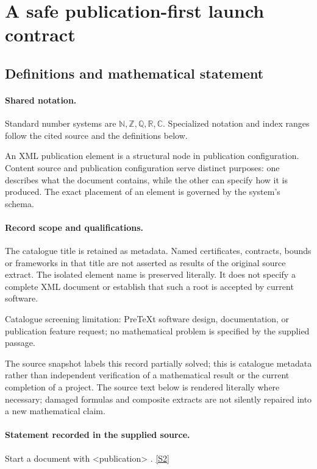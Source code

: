 \documentclass[11pt]{article}
\newcommand{\sref}[2]{\hyperlink{source:#1:#2}{[S#2]}}
\begin{document}
\section{A safe publication-first launch contract}\label{statement}

\subsection{Definitions and mathematical statement}

\paragraph{Shared notation.}Standard number systems are $\mathbb N,\mathbb Z,\mathbb Q,\mathbb R,\mathbb C$. Specialized notation and index ranges follow the cited source and the definitions below.


An XML publication element is a structural node in publication configuration. Content source and publication configuration serve distinct purposes: one describes what the document contains, while the other can specify how it is produced. The exact placement of an element is governed by the system's schema.
\paragraph{Record scope and qualifications.}
The catalogue title is retained as metadata. Named certificates, contracts, bounds or frameworks in that title are not asserted as results of the original source extract.
The isolated element name is preserved literally. It does not specify a complete XML document or establish that such a root is accepted by current software.

Catalogue screening limitation: PreTeXt software design, documentation, or publication feature request; no mathematical problem is specified by the supplied passage.

The source snapshot labels this record partially solved; this is catalogue metadata rather than independent verification of a mathematical result or the current completion of a project.
The source text below is rendered literally where necessary; damaged formulas and composite extracts are not silently repaired into a new mathematical claim.
\paragraph{Statement recorded in the supplied source.}
Start a document with <publication> . \sref{statement}{2}
\end{document}
